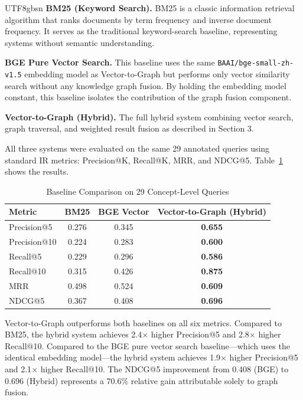 \documentclass[11pt]{article}
\begin{document}
\begin{CJK*}{UTF8}{gbsn}
\textbf{BM25 (Keyword Search).} BM25 is a classic information retrieval algorithm that ranks documents by term frequency and inverse document frequency. It serves as the traditional keyword-search baseline, representing systems without semantic understanding.

\textbf{BGE Pure Vector Search.} This baseline uses the same \texttt{BAAI/bge-small-zh-v1.5} embedding model as Vector-to-Graph but performs only vector similarity search without any knowledge graph fusion. By holding the embedding model constant, this baseline isolates the contribution of the graph fusion component.

\textbf{Vector-to-Graph (Hybrid).} The full hybrid system combining vector search, graph traversal, and weighted result fusion as described in Section 3.

All three systems were evaluated on the same 29 annotated queries using standard IR metrics: Precision@K, Recall@K, MRR, and NDCG@5. Table~\ref{tab:baseline_comparison} shows the results.

\begin{table}[htbp]
\centering
\caption{Baseline Comparison on 29 Concept-Level Queries}
\label{tab:baseline_comparison}
\begin{tabular}{lccc}
\toprule
Metric & BM25 & BGE Vector & Vector-to-Graph (Hybrid) \\
\midrule
Precision@5 & 0.276 & 0.345 & \textbf{0.655} \\
Precision@10 & 0.224 & 0.283 & \textbf{0.600} \\
Recall@5 & 0.229 & 0.296 & \textbf{0.586} \\
Recall@10 & 0.315 & 0.426 & \textbf{0.875} \\
MRR & 0.498 & 0.524 & \textbf{0.609} \\
NDCG@5 & 0.367 & 0.408 & \textbf{0.696} \\
\bottomrule
\end{tabular}
\end{table}

Vector-to-Graph outperforms both baselines on all six metrics. Compared to BM25, the hybrid system achieves 2.4$\times$ higher Precision@5 and 2.8$\times$ higher Recall@10. Compared to the BGE pure vector search baseline---which uses the identical embedding model---the hybrid system achieves 1.9$\times$ higher Precision@5 and 2.1$\times$ higher Recall@10. The NDCG@5 improvement from 0.408 (BGE) to 0.696 (Hybrid) represents a 70.6\% relative gain attributable solely to graph fusion.


\end{CJK*}
\end{document}
